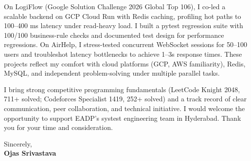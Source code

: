 \documentclass[a4paper,11pt]{article}
\begin{document}
On LogiFlow (Google Solution Challenge 2026 Global Top 106), I co-led a scalable backend on GCP Cloud Run with Redis caching, profiling hot paths to 100--400 ms latency under read-heavy load. I built a pytest regression suite with 100/100 business-rule checks and documented test design for performance regressions. On AirHelp, I stress-tested concurrent WebSocket sessions for 50--100 users and troubleshot latency bottlenecks to achieve 1--3s response times. These projects reflect my comfort with cloud platforms (GCP, AWS familiarity), Redis, MySQL, and independent problem-solving under multiple parallel tasks.

I bring strong competitive programming fundamentals (LeetCode Knight 2048, 711+ solved; Codeforces Specialist 1419, 252+ solved) and a track record of clear communication, peer collaboration, and technical initiative. I would welcome the opportunity to support EADP's systest engineering team in Hyderabad. Thank you for your time and consideration.

Sincerely, \\
\vspace{8mm}
\textbf{Ojas Srivastava}
\end{document}
